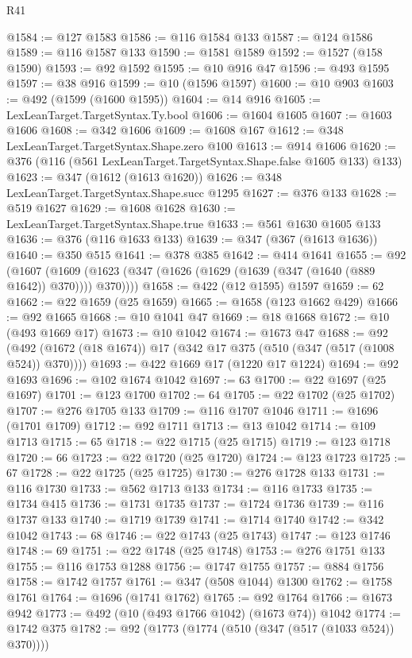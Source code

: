\begin{lexlean}{R41}
\begin{coremodule}
@1584 := @127 @1583
@1586 := @116 @1584 @133
@1587 := @124 @1586
@1589 := @116 @1587 @133
@1590 := @1581 @1589
@1592 := @1527 (@158 @1590)
@1593 := @92 @1592
@1595 := @10 @916 @47
@1596 := @493 @1595
@1597 := @38 @916
@1599 := @10 (@1596 @1597)
@1600 := @10 @903
@1603 := @492 (@1599 (@1600 @1595))
@1604 := @14 @916
@1605 := LexLeanTarget.TargetSyntax.Ty.bool
@1606 := @1604 @1605
@1607 := @1603 @1606
@1608 := @342 @1606
@1609 := @1608 @167
@1612 := @348 LexLeanTarget.TargetSyntax.Shape.zero @100
@1613 := @914 @1606
@1620 := @376 (@116 (@561 LexLeanTarget.TargetSyntax.Shape.false @1605 @133) @133)
@1623 := @347 (@1612 (@1613 @1620))
@1626 := @348 LexLeanTarget.TargetSyntax.Shape.succ @1295
@1627 := @376 @133
@1628 := @519 @1627
@1629 := @1608 @1628
@1630 := LexLeanTarget.TargetSyntax.Shape.true
@1633 := @561 @1630 @1605 @133
@1636 := @376 (@116 @1633 @133)
@1639 := @347 (@367 (@1613 @1636))
@1640 := @350 @515
@1641 := @378 @385
@1642 := @414 @1641
@1655 := @92
    (@1607 (@1609 (@1623 (@347 (@1626 (@1629 (@1639 (@347 (@1640 (@889 @1642)) @370)))) @370))))
@1658 := @422 (@12 @1595) @1597
@1659 := 62
@1662 := @22 @1659 (@25 @1659)
@1665 := @1658 (@123 @1662 @429)
@1666 := @92 @1665
@1668 := @10 @1041 @47
@1669 := @18 @1668
@1672 := @10 (@493 @1669 @17)
@1673 := @10 @1042
@1674 := @1673 @47
@1688 := @92 (@492 (@1672 (@18 @1674)) @17 (@342 @17 @375 (@510 (@347 (@517 (@1008 @524)) @370))))
@1693 := @422 @1669 @17 (@1220 @17 @1224)
@1694 := @92 @1693
@1696 := @102 @1674 @1042
@1697 := 63
@1700 := @22 @1697 (@25 @1697)
@1701 := @123 @1700
@1702 := 64
@1705 := @22 @1702 (@25 @1702)
@1707 := @276 @1705 @133
@1709 := @116 @1707 @1046
@1711 := @1696 (@1701 @1709)
@1712 := @92 @1711
@1713 := @13 @1042
@1714 := @109 @1713
@1715 := 65
@1718 := @22 @1715 (@25 @1715)
@1719 := @123 @1718
@1720 := 66
@1723 := @22 @1720 (@25 @1720)
@1724 := @123 @1723
@1725 := 67
@1728 := @22 @1725 (@25 @1725)
@1730 := @276 @1728 @133
@1731 := @116 @1730
@1733 := @562 @1713 @133
@1734 := @116 @1733
@1735 := @1734 @415
@1736 := @1731 @1735
@1737 := @1724 @1736
@1739 := @116 @1737 @133
@1740 := @1719 @1739
@1741 := @1714 @1740
@1742 := @342 @1042
@1743 := 68
@1746 := @22 @1743 (@25 @1743)
@1747 := @123 @1746
@1748 := 69
@1751 := @22 @1748 (@25 @1748)
@1753 := @276 @1751 @133
@1755 := @116 @1753 @1288
@1756 := @1747 @1755
@1757 := @884 @1756
@1758 := @1742 @1757
@1761 := @347 (@508 @1044) @1300
@1762 := @1758 @1761
@1764 := @1696 (@1741 @1762)
@1765 := @92 @1764
@1766 := @1673 @942
@1773 := @492 (@10 (@493 @1766 @1042) (@1673 @74)) @1042
@1774 := @1742 @375
@1782 := @92 (@1773 (@1774 (@510 (@347 (@517 (@1033 @524)) @370))))

\end{coremodule}
\end{lexlean}
